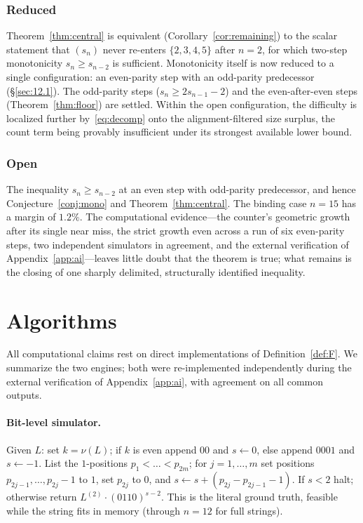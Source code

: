\documentclass[11pt,reqno]{amsart}
\theoremstyle{plain}
\theoremstyle{definition}
\theoremstyle{remark}
\begin{document}
\subsubsection*{Reduced} Theorem~\ref{thm:central} is equivalent (Corollary~\ref{cor:remaining}) to the scalar statement that $(s_n)$ never re-enters $\{2,3,4,5\}$ after $n=2$, for which two-step monotonicity $s_n\ge s_{n-2}$ is sufficient. Monotonicity itself is now reduced to a single configuration: an even-parity step with an odd-parity predecessor (\S\ref{sec:12.1}). The odd-parity steps ($s_n\ge 2s_{n-1}-2$) and the even-after-even steps (Theorem~\ref{thm:floor}) are settled. Within the open configuration, the difficulty is localized further by~\eqref{eq:decomp} onto the alignment-filtered size surplus, the count term being provably insufficient under its strongest available lower bound.

\subsubsection*{Open} The inequality $s_n\ge s_{n-2}$ at an even step with odd-parity predecessor, and hence Conjecture~\ref{conj:mono} and Theorem~\ref{thm:central}. The binding case $n=15$ has a margin of $1.2\%$. The computational evidence---the counter's geometric growth after its single near miss, the strict growth even across a run of six even-parity steps, two independent simulators in agreement, and the external verification of Appendix~\ref{app:ai}---leaves little doubt that the theorem is true; what remains is the closing of one sharply delimited, structurally identified inequality.

\appendix
\section{Algorithms}\label{app:alg}
All computational claims rest on direct implementations of Definition~\ref{def:F}. We summarize the two engines; both were re-implemented independently during the external verification of Appendix~\ref{app:ai}, with agreement on all common outputs.

\paragraph{Bit-level simulator.} Given $L$: set $k=\nu(L)$; if $k$ is even append $00$ and $s\leftarrow 0$, else append $0001$ and $s\leftarrow -1$. List the $1$-positions $p_1<\dots<p_{2m}$; for $j=1,\dots,m$ set positions $p_{2j-1},\dots,p_{2j}-1$ to $1$, set $p_{2j}$ to $0$, and $s\leftarrow s+(p_{2j}-p_{2j-1}-1)$. If $s<2$ halt; otherwise return $L^{(2)}\cdot(0110)^{s-2}$. This is the literal ground truth, feasible while the string fits in memory (through $n=12$ for full strings).
\end{document}
